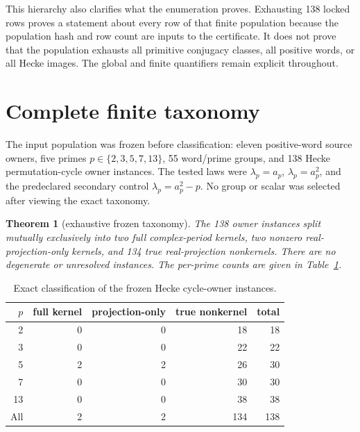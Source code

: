 \documentclass[11pt]{article}
\newtheorem{theorem}{Theorem}[section]
\theoremstyle{definition}
\theoremstyle{remark}
\begin{document}
This hierarchy also clarifies what the enumeration proves. Exhausting 138 locked rows proves a statement about every row of that finite population because the population hash and row count are inputs to the certificate. It does not prove that the population exhausts all primitive conjugacy classes, all positive words, or all Hecke images. The global and finite quantifiers remain explicit throughout.

\section{Complete finite taxonomy}

The input population was frozen before classification: eleven positive-word source owners, five primes $p\in\{2,3,5,7,13\}$, 55 word/prime groups, and 138 Hecke permutation-cycle owner instances. The tested laws were $\lambda_p=a_p$, $\lambda_p=a_p^2$, and the predeclared secondary control $\lambda_p=a_p^2-p$. No group or scalar was selected after viewing the exact taxonomy.

\begin{theorem}[exhaustive frozen taxonomy]\label{thm:taxonomy}
The 138 owner instances split mutually exclusively into two full complex-period kernels, two nonzero real-projection-only kernels, and 134 true real-projection nonkernels. There are no degenerate or unresolved instances. The per-prime counts are given in Table~\ref{tab:instances}.
\end{theorem}

\begin{table}[ht]
\centering
\caption{Exact classification of the frozen Hecke cycle-owner instances.}
\label{tab:instances}
\begin{tabular}{rrrrr}
\toprule
$p$ & full kernel & projection-only & true nonkernel & total\\
\midrule
2  & 0 & 0 & 18 & 18\\
3  & 0 & 0 & 22 & 22\\
5  & 2 & 2 & 26 & 30\\
7  & 0 & 0 & 30 & 30\\
13 & 0 & 0 & 38 & 38\\
\midrule
All & 2 & 2 & 134 & 138\\
\bottomrule
\end{tabular}
\end{table}
\end{document}
